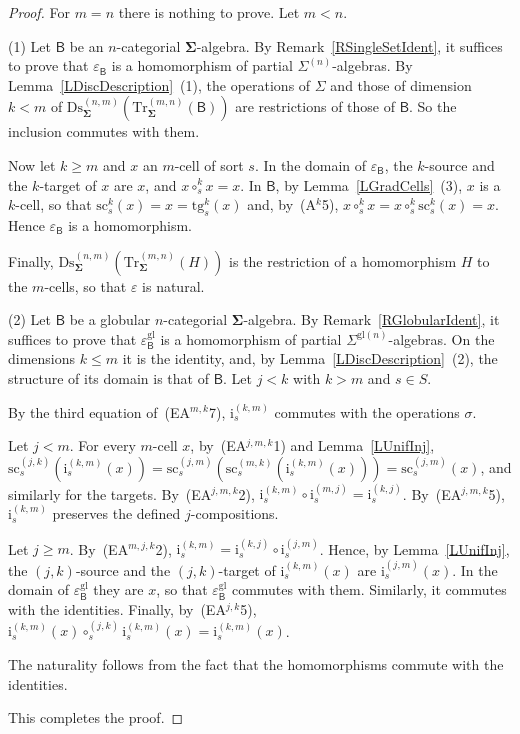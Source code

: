 \documentclass[a4paper, reqno
]{amsart}
\newcommand{\sig}[1]{\mathbf{#1}}             %
\newcommand{\calg}[1]{\boldsymbol{\mathsf{#1}}} %
\newcommand{\gl}{\mathrm{gl}}                %
\newcommand{\src}{\mathrm{sc}}
\newcommand{\tgt}{\mathrm{tg}}
\newcommand{\Ds}{\mathrm{Ds}}
\newcommand{\Tr}{\mathrm{Tr}}
\theoremstyle{plain}
\theoremstyle{definition}
\begin{document}
\begin{proof}
For $m=n$ there is nothing to prove.
Let $m<n$.

(1) Let $\calg{B}$ be an $n$-categorial $\sig{\Sigma}$-algebra.
By Remark~\ref{RSingleSetIdent}, it suffices to prove that $\varepsilon_{\calg{B}}$ is a homomorphism of partial $\Sigma^{(n)}$-algebras.
By Lemma~\ref{LDiscDescription}~(1), the operations of $\Sigma$ and those of dimension $k<m$ of $\Ds^{(n,m)}_{\sig{\Sigma}}(\Tr^{(m,n)}_{\sig{\Sigma}}(\calg{B}))$ are restrictions of those of $\calg{B}$.
So the inclusion commutes with them.

Now let $k\geq m$ and $x$ an $m$-cell of sort $s$.
In the domain of $\varepsilon_{\calg{B}}$, the $k$-source and the $k$-target of $x$ are $x$, and $x\circ^{k}_{s}x=x$.
In $\calg{B}$, by Lemma~\ref{LGradCells}~(3), $x$ is a $k$-cell, so that $\src^{k}_{s}(x)=x=\tgt^{k}_{s}(x)$ and, by~(A$^{k}$5), $x\circ^{k}_{s}x=x\circ^{k}_{s}\src^{k}_{s}(x)=x$.
Hence $\varepsilon_{\calg{B}}$ is a homomorphism.

Finally, $\Ds^{(n,m)}_{\sig{\Sigma}}(\Tr^{(m,n)}_{\sig{\Sigma}}(H))$ is the restriction of a homomorphism $H$ to the $m$-cells, so that $\varepsilon$ is natural.

(2) Let $\calg{B}$ be a globular $n$-categorial $\sig{\Sigma}$-algebra.
By Remark~\ref{RGlobularIdent}, it suffices to prove that $\varepsilon^{\gl}_{\calg{B}}$ is a homomorphism of partial $\Sigma^{\gl(n)}$-algebras.
On the dimensions $k\leq m$ it is the identity, and, by Lemma~\ref{LDiscDescription}~(2), the structure of its domain is that of $\calg{B}$.
Let $j<k$ with $k>m$ and $s\in S$.

By the third equation of~(EA$^{m,k}$7), $\mathrm{i}^{(k,m)}_{s}$ commutes with the operations $\sigma$.

Let $j<m$.
For every $m$-cell $x$, by~(EA$^{j,m,k}$1) and Lemma~\ref{LUnifInj}, $\src^{(j,k)}_{s}(\mathrm{i}^{(k,m)}_{s}(x))=\src^{(j,m)}_{s}(\src^{(m,k)}_{s}(\mathrm{i}^{(k,m)}_{s}(x)))=\src^{(j,m)}_{s}(x)$, and similarly for the targets.
By~(EA$^{j,m,k}$2), $\mathrm{i}^{(k,m)}_{s}\circ\mathrm{i}^{(m,j)}_{s}=\mathrm{i}^{(k,j)}_{s}$.
By~(EA$^{j,m,k}$5), $\mathrm{i}^{(k,m)}_{s}$ preserves the defined $j$-compositions.

Let $j\geq m$.
By~(EA$^{m,j,k}$2), $\mathrm{i}^{(k,m)}_{s}=\mathrm{i}^{(k,j)}_{s}\circ\mathrm{i}^{(j,m)}_{s}$.
Hence, by Lemma~\ref{LUnifInj}, the $(j,k)$-source and the $(j,k)$-target of $\mathrm{i}^{(k,m)}_{s}(x)$ are $\mathrm{i}^{(j,m)}_{s}(x)$.
In the domain of $\varepsilon^{\gl}_{\calg{B}}$ they are $x$, so that $\varepsilon^{\gl}_{\calg{B}}$ commutes with them.
Similarly, it commutes with the identities.
Finally, by~(EA$^{j,k}$5), $\mathrm{i}^{(k,m)}_{s}(x)\circ^{(j,k)}_{s}\mathrm{i}^{(k,m)}_{s}(x)=\mathrm{i}^{(k,m)}_{s}(x)$.

The naturality follows from the fact that the homomorphisms commute with the identities.

This completes the proof.
\end{proof}
\end{document}
